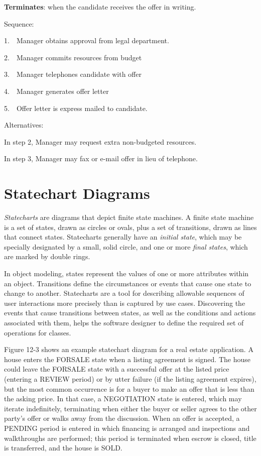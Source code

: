 \textbf{Terminates}: when the candidate receives the offer in writing.

Sequence:

1.\ \ Manager obtains approval from legal department.

2.\ \ Manager commits resources from budget

3.\ \ Manager telephones candidate with offer

4.\ \ Manager generates offer letter

5.\ \ Offer letter is express mailed to candidate.

Alternatives:

In step 2, Manager may request extra non-budgeted resources.

In step 3, Manager may fax or e-mail offer in lieu of telephone.

\section{Statechart Diagrams}

\textit{Statecharts} are diagrams that depict finite
state machines. A finite state machine is a
set of states, drawn as circles or ovals, plus a set of transitions,
drawn as lines that connect states. Statecharts generally have an
\textit{initial state}, which may be specially designated by a small,
solid circle, and one or more \textit{final states}, which are marked
by double rings.

In object modeling, states represent the values of one or more
attributes within an object. Transitions define the circumstances or
events that cause one state to change to another. Statecharts are a
tool for describing allowable sequences of user interactions more
precisely than is captured by use cases. Discovering the events that
cause transitions between states, as well as the conditions and actions
associated with them, helps the software designer to define the
required set of operations for classes.

Figure 12-3 shows an example statechart diagram for a real estate
application. A house enters the FORSALE state when a listing agreement
is signed. The house could leave the FORSALE state with a successful
offer at the listed price (entering a REVIEW period) or by utter
failure (if the listing agreement expires), but the most common
occurrence is for a buyer to make an offer that is less than the asking
price. In that case, a NEGOTIATION state is entered, which may iterate
indefinitely, terminating when either the buyer or seller agrees to the
other party's offer or walks away from the discussion.
When an offer is accepted, a PENDING period is entered in which
financing is arranged and inspections and walkthroughs are performed;
this period is terminated when escrow is closed, title is transferred,
and the house is SOLD.


